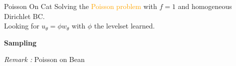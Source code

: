 \begin{frame}{Poisson On Cat}	
	 Solving the \textcolor{orange}{Poisson problem} with $f=1$ and homogeneous Dirichlet BC. \\
	 Looking for $u_\theta = \phi w_\theta$ with $\phi$ the levelset learned. 
	
	\begin{center}
		\begin{minipage}{0.32\linewidth}
			\textbf{Sampling}
			
			\vspace{-10pt}
			\centering
		\end{minipage} \qquad 
		\begin{minipage}{0.32\linewidth}
			\centering
		\end{minipage} 
	\end{center}

	\begin{center}
	\end{center}

	\footnotesize
	\textit{Remark :} Poisson on Bean 
\end{frame}